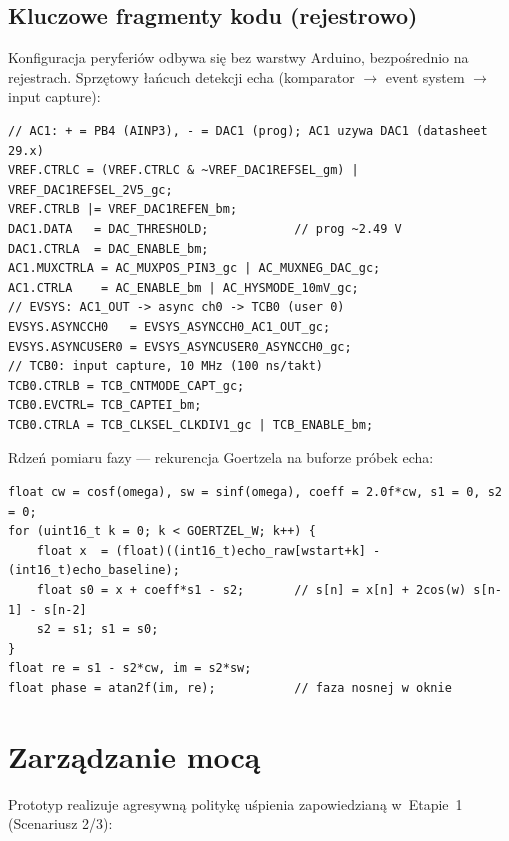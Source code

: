 \documentclass[a4paper,11pt]{article}
\begin{document}
\subsection{Kluczowe fragmenty kodu (rejestrowo)}
\label{sec:listings}

Konfiguracja peryferiów odbywa się bez warstwy Arduino, bezpośrednio na
rejestrach. Sprzętowy łańcuch detekcji echa (komparator $\to$ event system
$\to$ input capture):

\begin{lstlisting}[caption={Łańcuch AC1 $\to$ EVSYS $\to$ TCB0 (rejestrowo)},label={lst:hw}]
// AC1: + = PB4 (AINP3), - = DAC1 (prog); AC1 uzywa DAC1 (datasheet 29.x)
VREF.CTRLC = (VREF.CTRLC & ~VREF_DAC1REFSEL_gm) | VREF_DAC1REFSEL_2V5_gc;
VREF.CTRLB |= VREF_DAC1REFEN_bm;
DAC1.DATA   = DAC_THRESHOLD;            // prog ~2.49 V
DAC1.CTRLA  = DAC_ENABLE_bm;
AC1.MUXCTRLA = AC_MUXPOS_PIN3_gc | AC_MUXNEG_DAC_gc;
AC1.CTRLA    = AC_ENABLE_bm | AC_HYSMODE_10mV_gc;
// EVSYS: AC1_OUT -> async ch0 -> TCB0 (user 0)
EVSYS.ASYNCCH0   = EVSYS_ASYNCCH0_AC1_OUT_gc;
EVSYS.ASYNCUSER0 = EVSYS_ASYNCUSER0_ASYNCCH0_gc;
// TCB0: input capture, 10 MHz (100 ns/takt)
TCB0.CTRLB = TCB_CNTMODE_CAPT_gc;
TCB0.EVCTRL= TCB_CAPTEI_bm;
TCB0.CTRLA = TCB_CLKSEL_CLKDIV1_gc | TCB_ENABLE_bm;
\end{lstlisting}

Rdzeń pomiaru fazy --- rekurencja Goertzela na buforze próbek echa:

\begin{lstlisting}[caption={Filtr Goertzela @ 40 kHz},label={lst:goertzel}]
float cw = cosf(omega), sw = sinf(omega), coeff = 2.0f*cw, s1 = 0, s2 = 0;
for (uint16_t k = 0; k < GOERTZEL_W; k++) {
    float x  = (float)((int16_t)echo_raw[wstart+k] - (int16_t)echo_baseline);
    float s0 = x + coeff*s1 - s2;       // s[n] = x[n] + 2cos(w) s[n-1] - s[n-2]
    s2 = s1; s1 = s0;
}
float re = s1 - s2*cw, im = s2*sw;
float phase = atan2f(im, re);           // faza nosnej w oknie
\end{lstlisting}

\section{Zarządzanie mocą}
\label{sec:moc}

Prototyp realizuje agresywną politykę uśpienia zapowiedzianą w~Etapie~1
(Scenariusz 2/3):
\end{document}
